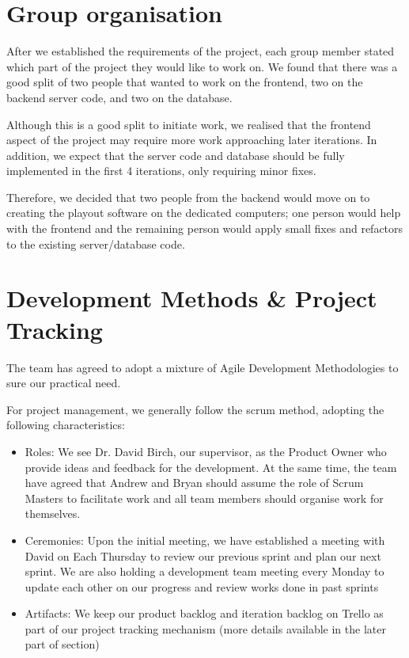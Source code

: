 \documentclass[a4paper]{article}
\begin{document}
\section{Group organisation} \label{sec:group}
After we established the requirements of the project, each group member stated
which part of the project they would like to work on. We found that there was a
good split of two people that wanted to work on the frontend, two on the backend
server code, and two on the database.

Although this is a good split to initiate work, we realised that the frontend 
aspect of the project may require more work approaching later iterations.
In addition, we  expect that the server code and database should be fully 
implemented in the first 4 iterations, only requiring minor fixes.

Therefore, we decided that two people from the backend would move on to creating
the playout software on the dedicated computers; one person would help with the
frontend and the remaining person would apply small fixes and refactors to the
existing server/database code. 


\section{Development Methods \& Project Tracking}
The team has agreed to adopt a mixture of Agile Development Methodologies to
sure our practical need.

For project management, we generally follow the scrum method, adopting the
following characteristics:
\begin{itemize}
  \item Roles: We see Dr. David Birch, our supervisor, as the Product Owner
        who provide ideas and feedback for the development. At the same time,
        the team have agreed that Andrew and Bryan should assume the role of
        Scrum Masters to facilitate work and all team members should organise
        work for themselves.
  \item Ceremonies: Upon the initial meeting, we have established a
        meeting with David on Each Thursday to review our previous sprint 
        and plan our next sprint. We are also holding a development team
        meeting every Monday to update each other on our progress and
        review works done in past sprints
  \item Artifacts: We keep our product backlog and iteration backlog on
        Trello as part of our project tracking mechanism (more details
        available in the later part of section)
\end{itemize}
\end{document}
